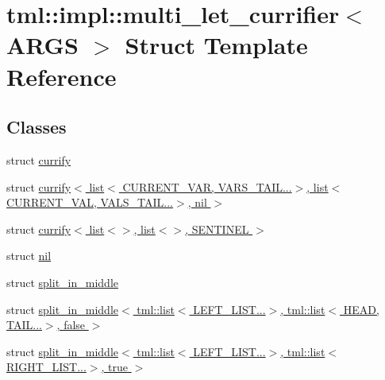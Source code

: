\hypertarget{structtml_1_1impl_1_1multi__let__currifier}{\section{tml\+:\+:impl\+:\+:multi\+\_\+let\+\_\+currifier$<$ A\+R\+G\+S $>$ Struct Template Reference}
\label{structtml_1_1impl_1_1multi__let__currifier}
}
\subsection*{Classes}
\begin{DoxyCompactItemize}
\item 
struct \hyperlink{structtml_1_1impl_1_1multi__let__currifier_1_1currify}{currify}
\item 
struct \hyperlink{structtml_1_1impl_1_1multi__let__currifier_1_1currify_3_01list_3_01_c_u_r_r_e_n_t___v_a_r_00_01_eb6650de68f85d5dffec025b2ce9641c}{currify$<$ list$<$ C\+U\+R\+R\+E\+N\+T\+\_\+\+V\+A\+R, V\+A\+R\+S\+\_\+\+T\+A\+I\+L...$>$, list$<$ C\+U\+R\+R\+E\+N\+T\+\_\+\+V\+A\+L, V\+A\+L\+S\+\_\+\+T\+A\+I\+L...$>$, nil $>$}
\item 
struct \hyperlink{structtml_1_1impl_1_1multi__let__currifier_1_1currify_3_01list_3_4_00_01list_3_4_00_01_s_e_n_t_i_n_e_l_01_4}{currify$<$ list$<$$>$, list$<$$>$, S\+E\+N\+T\+I\+N\+E\+L $>$}
\item 
struct \hyperlink{structtml_1_1impl_1_1multi__let__currifier_1_1nil}{nil}
\item 
struct \hyperlink{structtml_1_1impl_1_1multi__let__currifier_1_1split__in__middle}{split\+\_\+in\+\_\+middle}
\item 
struct \hyperlink{structtml_1_1impl_1_1multi__let__currifier_1_1split__in__middle_3_01tml_1_1list_3_01_l_e_f_t___le72d747a3c296a0f5b98662042d403db}{split\+\_\+in\+\_\+middle$<$ tml\+::list$<$ L\+E\+F\+T\+\_\+\+L\+I\+S\+T...$>$, tml\+::list$<$ H\+E\+A\+D, T\+A\+I\+L...$>$, false $>$}
\item 
struct \hyperlink{structtml_1_1impl_1_1multi__let__currifier_1_1split__in__middle_3_01tml_1_1list_3_01_l_e_f_t___ld9733f5c21967624b3111370412aab07}{split\+\_\+in\+\_\+middle$<$ tml\+::list$<$ L\+E\+F\+T\+\_\+\+L\+I\+S\+T...$>$, tml\+::list$<$ R\+I\+G\+H\+T\+\_\+\+L\+I\+S\+T...$>$, true $>$}
\end{DoxyCompactItemize}
